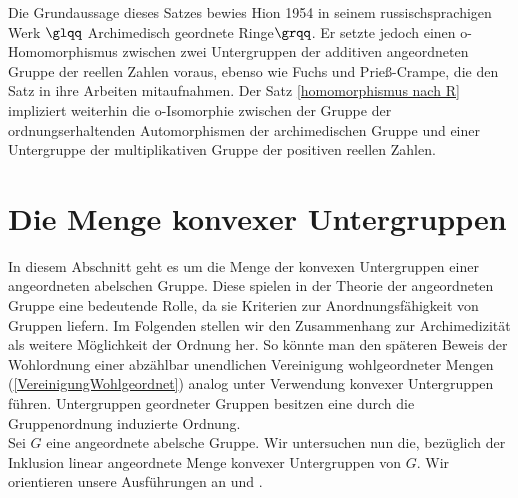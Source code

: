 %
%
%
%
Die Grundaussage dieses Satzes bewies Hion 1954 in seinem russischsprachigen Werk $\glqq$ Archimedisch geordnete Ringe$\grqq$. Er setzte jedoch einen o-Homomorphismus zwischen zwei Untergruppen der additiven angeordneten Gruppe der reellen Zahlen voraus, ebenso wie Fuchs und Prieß-Crampe, die den Satz in ihre Arbeiten mitaufnahmen.  Der Satz \ref{homomorphismus nach R} impliziert weiterhin die o-Isomorphie zwischen der Gruppe der ordnungserhaltenden Automorphismen der archimedischen Gruppe und einer Untergruppe der multiplikativen Gruppe der positiven reellen Zahlen. \cite{priesscrampe83}
%
%
%
%
%
\section{Die Menge konvexer Untergruppen}
In diesem Abschnitt geht es um die Menge der konvexen Untergruppen einer angeordneten abelschen Gruppe. Diese spielen in der Theorie der angeordneten Gruppe eine bedeutende Rolle, da sie Kriterien zur Anordnungsfähigkeit von Gruppen liefern. Im Folgenden stellen wir den Zusammenhang zur Archimedizität als weitere Möglichkeit der Ordnung her. So könnte man den späteren Beweis der Wohlordnung einer abzählbar unendlichen Vereinigung wohlgeordneter Mengen (\ref{VereinigungWohlgeordnet}) analog unter Verwendung konvexer Untergruppen führen.
 Untergruppen geordneter Gruppen besitzen eine durch die Gruppenordnung induzierte Ordnung. \\
% 
 
Sei $G$ eine angeordnete abelsche Gruppe.
Wir untersuchen nun die, bezüglich der Inklusion linear angeordnete Menge konvexer Untergruppen von $G$. Wir orientieren unsere Ausführungen an \cite[S. 81 - 83]{fuchs66}  und \cite[S. 3]{priesscrampe83}.

